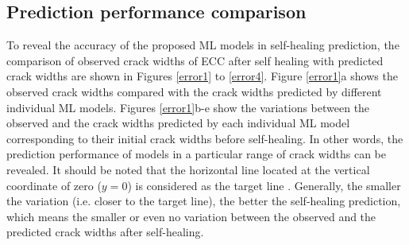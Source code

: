 \documentclass[11pt]{article}
\begin{document}
	
	\subsection{Prediction performance comparison}
To reveal the accuracy of the proposed ML models in self-healing prediction, the comparison of observed crack widths of ECC after self healing with predicted crack widths are shown in Figures \ref{error1} to \ref{error4}. Figure \ref{error1}a shows the observed crack widths compared with the crack widths predicted by different individual ML models. Figures \ref{error1}b-e show the variations between the observed and the crack widths predicted by each individual ML model corresponding to their initial crack widths before self-healing. In other words, the prediction performance of models in a particular range of crack widths can be revealed. It should be noted that the horizontal line located at the vertical coordinate of zero ($ y = 0$) is considered as the target line \cite{alshihri2009neural,yan2017evaluation}. Generally, the smaller the variation (i.e. closer to the target line), the better the self-healing prediction, which means the smaller or even no variation between the observed and the predicted crack widths after self-healing.
	
\end{document}

